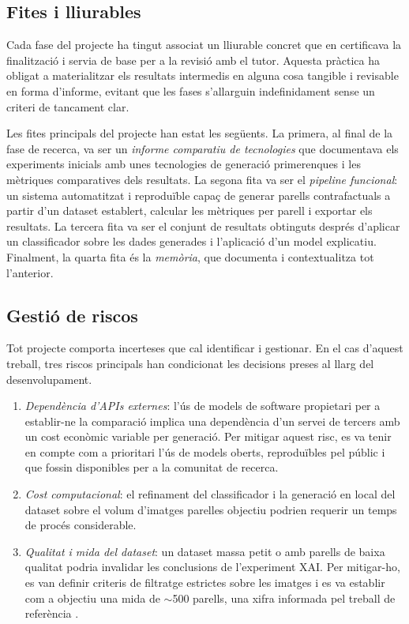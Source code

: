 \subsection{Fites i lliurables}
Cada fase del projecte ha tingut associat un lliurable concret que en certificava la finalització i servia de base per a la revisió amb el tutor. Aquesta pràctica ha obligat a materialitzar els resultats intermedis en alguna cosa tangible i revisable en forma d'informe, evitant que les fases s'allarguin indefinidament sense un criteri de tancament clar.

Les fites principals del projecte han estat les següents. La primera, al final de la fase de recerca, va ser un \emph{informe comparatiu de tecnologies} que documentava els experiments inicials amb unes tecnologies de generació primerenques i les mètriques comparatives dels resultats. La segona fita va ser el \emph{pipeline funcional}: un sistema automatitzat i reproduïble capaç de generar parells contrafactuals a partir d'un dataset establert, calcular les mètriques per parell i exportar els resultats. La tercera fita va ser el conjunt de resultats obtinguts després d'aplicar un classificador sobre les dades generades i l'aplicació d'un model explicatiu. Finalment, la quarta fita és la \emph{memòria}, que documenta i contextualitza tot l'anterior.

\subsection{Gestió de riscos}
Tot projecte comporta incerteses que cal identificar i gestionar. En el cas d'aquest treball, tres riscos principals han condicionat les decisions preses al llarg del desenvolupament.

\begin{enumerate}
\item \emph{Dependència d'APIs externes}: l'ús de models de software propietari per a establir-ne la comparació implica una dependència d'un servei de tercers amb un cost econòmic variable per generació. Per mitigar aquest risc, es va tenir en compte com a prioritari l'ús de models oberts, reproduïbles pel públic i que fossin disponibles per a la comunitat de recerca. 

\item \emph{Cost computacional}: el refinament del classificador i la generació en local del dataset sobre el volum d'imatges parelles objectiu podrien requerir un temps de procés considerable. 

\item \emph{Qualitat i mida del dataset}: un dataset massa petit o amb parells de baixa qualitat podria invalidar les conclusions de l'experiment XAI. Per mitigar-ho, es van definir criteris de filtratge estrictes sobre les imatges i es va establir com a objectiu una mida de $\sim$500 parells, una xifra informada pel treball de referència \cite{Hesse2023}.
\end{enumerate}

